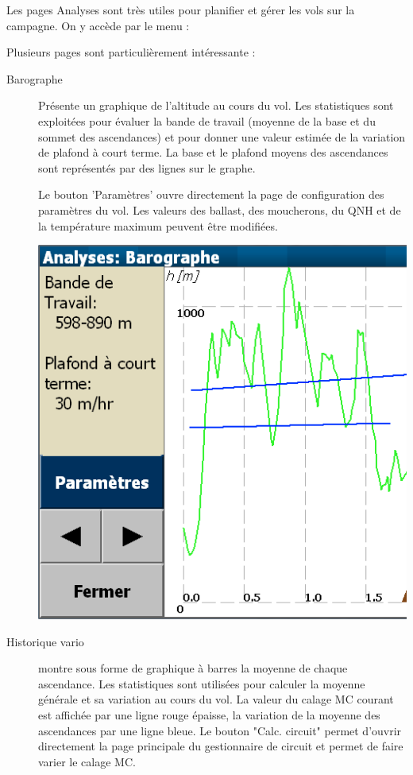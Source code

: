 Les pages Analyses sont très utiles pour planifier et gérer les vols sur la campagne. On y accède par le menu :
\begin{quote}
\blink{}
\end{quote}

Plusieurs pages sont particulièrement intéressante :
\begin{description}
\item[Barographe]  Présente un graphique de l'altitude au cours du vol. Les statistiques sont exploitées pour évaluer la bande de travail (moyenne de la base et du sommet des ascendances) et pour donner une valeur estimée de la variation de plafond à court terme. La base et le plafond moyens des ascendances sont représentés par des lignes sur le graphe.

Le bouton 'Paramètres' ouvre directement la page de configuration des paramètres du vol. Les valeurs des ballast, des moucherons, du QNH et de la température maximum peuvent être modifiées.

\begin{center}
\includegraphics[angle=0,width=0.8\linewidth,keepaspectratio='true']{figures/analysis-barograph.png}
\end{center}

\item[Historique vario]
montre sous forme de graphique à barres la moyenne de chaque ascendance. Les statistiques sont utilisées pour calculer la moyenne générale et sa variation au cours du vol. La valeur du calage MC courant est affichée par une ligne rouge épaisse, la variation de la moyenne des ascendances par une ligne bleue.
Le bouton "Calc. circuit" permet d'ouvrir directement la page principale du gestionnaire de circuit et permet de faire varier le calage MC.


\end{description}

